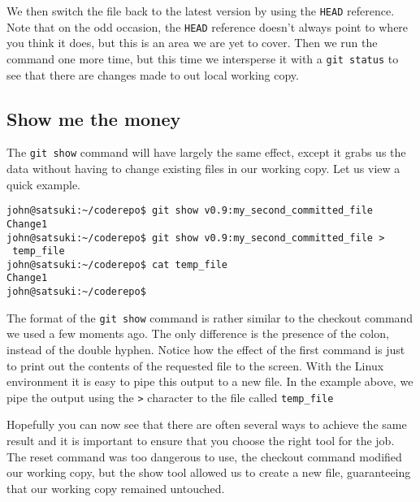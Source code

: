 We then switch the file back to the latest version by using the \texttt{HEAD} reference.  Note that on the odd occasion, the \texttt{HEAD} reference doesn't always point to where you think it does, but this is an area we are yet to cover.  Then we run the command one more time, but this time we intersperse it with a \texttt{git status} to see that there are changes made to out local working copy.

\subsection{Show me the money}
The \texttt{git show} command will have largely the same effect, except it grabs us the data without having to change existing files in our working copy.  Let us view a quick example.

\begin{Verbatim}[frame=leftline,framerule=1mm,fontsize=\relsize{-3}] 
john@satsuki:~/coderepo$ git show v0.9:my_second_committed_file
Change1
john@satsuki:~/coderepo$ git show v0.9:my_second_committed_file > 
 temp_file
john@satsuki:~/coderepo$ cat temp_file 
Change1
john@satsuki:~/coderepo$ 
\end{Verbatim}

The format of the \texttt{git show} command is rather similar to the checkout command we used a few moments ago.  The only difference is the presence of the colon, instead of the double hyphen.  Notice how the effect of the first command is just to print out the contents of the requested file to the screen.  With the Linux environment it is easy to pipe this output to a new file.  In the example above, we pipe the output using the \texttt{>} character to the file called \texttt{temp\_file}

Hopefully you can now see that there are often several ways to achieve the same result and it is important to ensure that you choose the right tool for the job.  The reset command was too dangerous to use, the checkout command modified our working copy, but the show tool allowed us to create a new file, guaranteeing that our working copy remained untouched.


